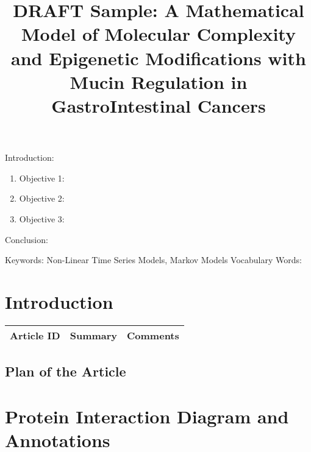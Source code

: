 


\twocolumn
\scriptsize
\begin{frontmatter}
		\title{DRAFT Sample: A Mathematical Model of Molecular Complexity and Epigenetic Modifications with Mucin Regulation in GastroIntestinal Cancers}
		\author{}
		\address{The Mathematical Learning Space}
\end{frontmatter}	

Introduction:
\begin{enumerate}
\item Objective 1:
\item Objective 2:
\item Objective 3:
\end{enumerate}
Conclusion:

Keywords: Non-Linear Time Series Models, Markov Models
Vocabulary Words:

\section{Introduction}

\begin{table}[H]\centering
	\begin{tabular}{p{1cm}p{4cm}p{3cm}}
		Article ID & Summary & Comments\\
		\hline
		\hline
	\end{tabular}
\end{table}


\subsection{Plan of the Article}

\begin{enumerate}
\end{enumerate}


\section{Protein Interaction Diagram and Annotations}

